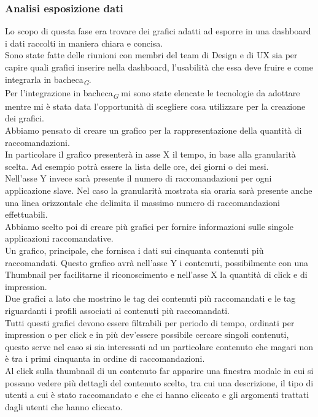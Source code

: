 \documentclass[a4paper, 12pt, twoside, openright]{book}
\newcommand{\gloss}[1]{#1\textsubscript{\textit{\tiny{G}}}}
\begin{document}
\subsubsection{Analisi esposizione dati}
Lo scopo di questa fase era trovare dei grafici adatti ad esporre in una dashboard i dati raccolti in maniera chiara e concisa.\\
Sono state fatte delle riunioni con membri del team di Design e di UX sia per capire quali grafici inserire nella dashboard, l'usabilità che essa deve fruire e come integrarla in \gloss{bacheca}.\\
Per l'integrazione in \gloss{bacheca} mi sono state elencate le tecnologie da adottare mentre mi è stata data l'opportunità di scegliere cosa utilizzare per la creazione dei grafici.\\
Abbiamo pensato di creare un grafico per la rappresentazione della quantità di raccomandazioni.\\
In particolare il grafico presenterà in asse X il tempo, in base alla granularità scelta. Ad esempio potrà essere la lista delle ore, dei giorni o dei mesi.\\
Nell'asse Y invece sarà presente il numero di raccomandazioni per ogni applicazione slave. Nel caso la granularità mostrata sia oraria sarà presente anche una linea orizzontale che delimita il massimo numero di raccomandazioni effettuabili.\\
Abbiamo scelto poi di creare più grafici per fornire informazioni sulle singole applicazioni raccomandative.\\
Un grafico, principale, che fornisca i dati sui cinquanta contenuti più raccomandati. Questo grafico avrà nell'asse Y i contenuti, possibilmente con una Thumbnail per facilitarne il riconoscimento e nell'asse X la quantità di click e di impression.\\
Due grafici a lato che mostrino le tag dei contenuti più raccomandati e le tag riguardanti i profili associati ai contenuti più raccomandati.\\
Tutti questi grafici devono essere filtrabili per periodo di tempo, ordinati per impression o per click e in più dev'essere possibile cercare singoli contenuti, questo serve nel caso si sia interessati ad un particolare contenuto che magari non è tra i primi cinquanta in ordine di raccomandazioni.\\
Al click sulla thumbnail di un contenuto far apparire una finestra modale in cui si possano vedere più dettagli del contenuto scelto, tra cui una descrizione, il tipo di utenti a cui è stato raccomandato e che ci hanno cliccato e gli argomenti trattati dagli utenti che hanno cliccato.
\end{document}
